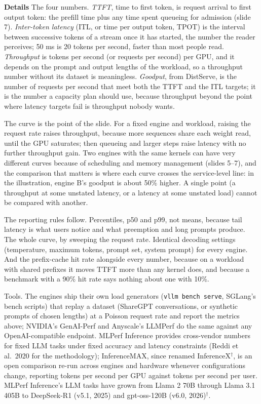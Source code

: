 \documentclass[11pt,letterpaper]{article}
\newcommand{\para}[1]{\medskip\noindent\textbf{#1}\quad}
\begin{document}
\para{Details} The four numbers. \emph{TTFT}, time to first token, is request arrival to first output token: the prefill time plus any time spent queueing for admission (slide 7). \emph{Inter-token latency} (ITL, or time per output token, TPOT) is the interval between successive tokens of a stream once it has started, the number the reader perceives; 50 ms is 20 tokens per second, faster than most people read. \emph{Throughput} is tokens per second (or requests per second) per GPU, and it depends on the prompt and output lengths of the workload, so a throughput number without its dataset is meaningless. \emph{Goodput}, from DistServe, is the number of requests per second that meet both the TTFT and the ITL targets; it is the number a capacity plan should use, because throughput beyond the point where latency targets fail is throughput nobody wants.

The curve is the point of the slide. For a fixed engine and workload, raising the request rate raises throughput, because more sequences share each weight read, until the GPU saturates; then queueing and larger steps raise latency with no further throughput gain. Two engines with the same kernels can have very different curves because of scheduling and memory management (slides 5--7), and the comparison that matters is where each curve crosses the service-level line: in the illustration, engine B's goodput is about 50\% higher. A single point (a throughput at some unstated latency, or a latency at some unstated load) cannot be compared with another.

The reporting rules follow. Percentiles, p50 and p99, not means, because tail latency is what users notice and what preemption and long prompts produce. The whole curve, by sweeping the request rate. Identical decoding settings (temperature, maximum tokens, prompt set, system prompt) for every engine. And the prefix-cache hit rate alongside every number, because on a workload with shared prefixes it moves TTFT more than any kernel does, and because a benchmark with a 90\% hit rate says nothing about one with 10\%.

Tools. The engines ship their own load generators (\texttt{vllm bench serve}, SGLang's bench scripts) that replay a dataset (ShareGPT conversations, or synthetic prompts of chosen lengths) at a Poisson request rate and report the metrics above; NVIDIA's GenAI-Perf and Anyscale's LLMPerf do the same against any OpenAI-compatible endpoint. MLPerf Inference provides cross-vendor numbers for fixed LLM tasks under fixed accuracy and latency constraints (Reddi et al.\ 2020 for the methodology); InferenceMAX, since renamed InferenceX$^\dagger$, is an open comparison re-run across engines and hardware whenever configurations change, reporting tokens per second per GPU against tokens per second per user. MLPerf Inference's LLM tasks have grown from Llama 2 70B through Llama 3.1 405B to DeepSeek-R1 (v5.1, 2025) and gpt-oss-120B (v6.0, 2026)$^\dagger$.
\end{document}
